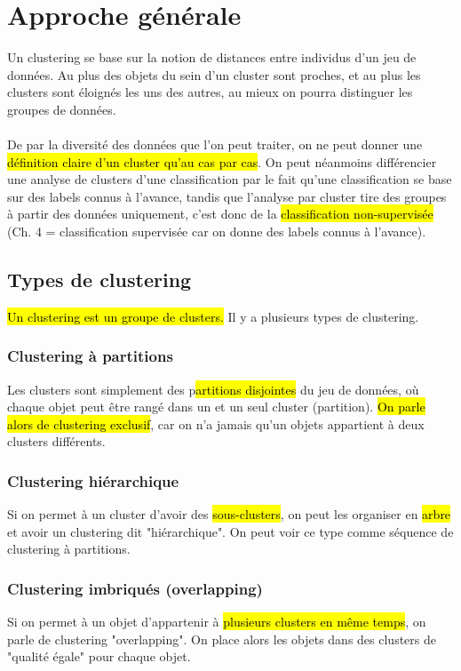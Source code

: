 \documentclass[letterpaper, 12pt]{article}
\newcommand{\alinea}{
\hspace*{0.5cm}}
\begin{document}
	\section{Approche générale}
		\alinea Un clustering se base sur la notion de distances entre
			individus d'un jeu de données. Au plus des objets du sein
			d'un cluster sont proches, et au plus les clusters sont éloignés
			les uns des autres, au mieux on pourra distinguer les groupes
			de données.\\
		~\\
		\alinea De par la diversité des données que l'on peut traiter, 
			on ne peut donner une\hl{ définition claire d'un cluster qu'au
			cas par cas}. On peut néanmoins différencier une analyse
			de clusters d'une classification par le fait qu'une classification
			se base sur des labels connus à l'avance, tandis que l'analyse
			par cluster tire des groupes à partir des données uniquement, 
			c'est donc de la \hl{classification non-supervisée} (Ch. 4 = 
			classification supervisée car on donne des labels connus à 
			l'avance).
		\subsection{Types de clustering}
			\alinea \hl{Un clustering est un groupe de clusters.} Il y a 
				plusieurs types de clustering.
			\subsubsection{Clustering à partitions}
				\alinea Les clusters sont simplement des p\hl{artitions 
					disjointes} du jeu de données, où chaque objet
					peut être rangé dans un et un seul cluster (partition).
					\hl{On parle alors de clustering exclusif}, car
					on n'a jamais qu'un objets appartient à deux clusters
					différents.
			\subsubsection{Clustering hiérarchique}
				\alinea Si on permet à un cluster d'avoir des 
					\hl{sous-clusters},
					on peut les organiser en \hl{arbre} et avoir un clustering
					dit "hiérarchique". On peut voir ce type comme
					séquence de clustering à partitions.
			\subsubsection{Clustering imbriqués (overlapping)}
				\alinea Si on permet à un objet d'appartenir à \hl{plusieurs
					clusters en même temps}, on parle de clustering
					"overlapping".
					On place alors les objets dans des clusters de "qualité
					égale" pour chaque objet.			
\end{document}
